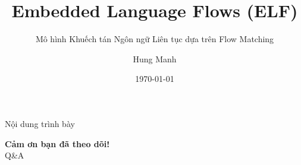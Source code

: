 \documentclass[aspectratio=169]{beamer}
\title[Embedded Language Flows]{Embedded Language Flows (ELF)}
\subtitle{Mô hình Khuếch tán Ngôn ngữ Liên tục dựa trên Flow Matching}
\author{Hung Manh}
\date{\today}
\begin{document}
\begin{frame}
    \titlepage
\end{frame}

\begin{frame}{Nội dung trình bày}
    \tableofcontents
\end{frame}



\begin{frame}
    \centering
    \Huge \textbf{Cảm ơn bạn đã theo dõi!}\\
    \vspace{0.5cm}
    \Large Q\&A
\end{frame}
\end{document}

